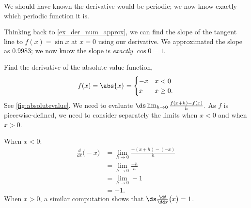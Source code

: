 We should have known the derivative would be periodic; we now know exactly which periodic function it is.

Thinking back to \autoref{ex_der_num_approx}, we can find the slope of the tangent line to $f(x)=\sin x$ at $x=0$ using our derivative. We approximated the slope as $0.9983$; we now know the slope is \emph{exactly} $\cos 0 =1$.

\begin{example}\label{ex_not_diff}
Find the derivative of the absolute value function,
\[f(x) = \abs{x} = \begin{cases}-x & x<0 \\ x & x\geq 0.\end{cases}\]\vspace{-.5\baselineskip}
See \autoref{fig:absolutevalue}.
\solution
We need to evaluate $\ds \lim_{h\to0}\frac{f(x+h)-f(x)}{h}.$ As $f$ is piecewise-defined, we need to consider separately the limits when $x<0$ and when $x>0$.


When $x<0$:
	\begin{align*}
	\frac{\dd}{\dd x}\bigl(-x\bigr)
	&= \lim_{h\to 0}\frac{-(x+h) - (-x)}{h} \\
	&=	\lim_{h\to 0}\frac{-h}{h}\\
	&=	\lim_{h\to 0}-1 \\
	&=	-1.
	\end{align*}
When $x>0$, a similar computation shows that $\ds \frac{\dd}{\dd x}\bigl(x\bigr) = 1$.


\end{example}

